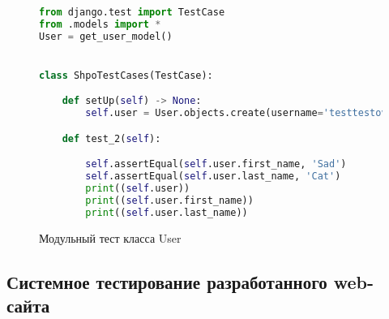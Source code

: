 \begin{figure}[ht]
\begin{lstlisting}[language=Python]
from django.test import TestCase
from .models import *
User = get_user_model()


class ShpoTestCases(TestCase):

    def setUp(self) -> None:
        self.user = User.objects.create(username='testtestovich', password='testtestovich', first_name='Sad', last_name='')

    def test_2(self):

        self.assertEqual(self.user.first_name, 'Sad')
        self.assertEqual(self.user.last_name, 'Cat')
        print((self.user))
        print((self.user.first_name))
        print((self.user.last_name))
\end{lstlisting}  
\caption{Модульный тест класса User}
\label{unitUser:image}
\end{figure}

\subsection{Системное тестирование разработанного web-сайта}





